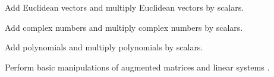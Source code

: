 \begin{readinessAssuranceOutcomes}
\item Add Euclidean vectors and multiply Euclidean vectors by scalars.
\item Add complex numbers and multiply complex numbers by scalars.
\item Add polynomials and multiply polynomials by scalars.
\item Perform basic manipulations of augmented matrices and linear
systems .
\end{readinessAssuranceOutcomes}
